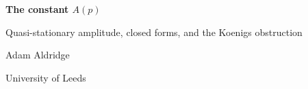 \documentclass[11pt]{report}
\begin{document}
\begin{titlepage}
\centering
\vspace*{4cm}
{\LARGE\bfseries The constant $A(p)$\par}
\vspace{6pt}
{\large Quasi-stationary amplitude, closed forms, and the Koenigs obstruction\par}
\vspace{2.5cm}
{\large Adam Aldridge\par}
\vspace{4pt}
{University of Leeds\par}
\end{titlepage}

\tableofcontents
\clearpage



\FloatBarrier
\begingroup
\footnotesize


\endgroup
\end{document}
